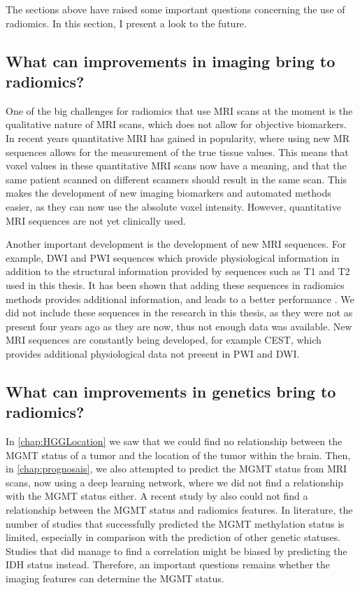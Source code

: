 The sections above have raised some important questions concerning the use of radiomics.
In this section, I present a look to the future.


\subsection{What can improvements in imaging bring to radiomics?}\label{sec:dicussion_new_imaging}

One of the big challenges for radiomics that use \gls{MRI} scans at the moment is the qualitative nature of \gls{MRI} scans, which does not allow for objective biomarkers.
In recent years quantitative \gls{MRI} has gained in popularity, where using new \gls{MR} sequences allows for the measurement of the true tissue values.
This means that voxel values in these quantitative \gls{MRI} scans now have a meaning, and that the same patient scanned on different scanners should result in the same scan.
This makes the development of new imaging biomarkers and automated methods easier, as they can now use the absolute voxel intensity.
However, quantitative \gls{MRI} sequences are not yet clinically used.

Another important development is the development of new \gls{MRI} sequences.
For example, \gls{DWI} and \gls{PWI} sequences which provide physiological information in addition to the structural information provided by sequences such as \gls{T1} and \gls{T2} used in this thesis.
It has been shown that adding these sequences in radiomics methods provides additional information, and leads to a better performance \autocite{park2020radiomicsdwi,kim2020radiomicsdwi}.
We did not include these sequences in the research in this thesis, as they were not as present four years ago as they are now, thus not enough data was available.
New \gls{MRI} sequences are constantly being developed, for example \gls{CEST}, which provides additional physiological data not present in \gls{PWI} and \gls{DWI}.



\subsection{What can improvements in genetics bring to radiomics?}\label{sec:discussion_new_genetics}

In \cref{chap:HGGLocation} we saw that we could find no relationship between the \gls{MGMT} status of a tumor and the location of the tumor within the brain.
Then, in \cref{chap:prognosais}, we also attempted to predict the \gls{MGMT} status from \gls{MRI} scans, now using a deep learning network, where we did not find a relationship with the \gls{MGMT} status either.
A recent study by  also could not find a relationship between the \gls{MGMT} status and radiomics features.
In literature, the number of studies that successfully predicted the MGMT methylation status is limited, especially in comparison with the prediction of other genetic statuses.
Studies that did manage to find a correlation might be biased by predicting the IDH status instead.
Therefore, an important questions remains whether the imaging features can determine the MGMT status.


